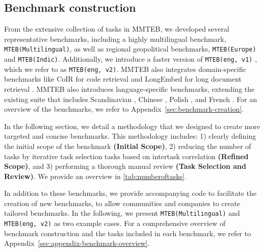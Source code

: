 \subsection{Benchmark construction}
\label{sec:benchmarkconstruction}
From the extensive collection of tasks in MMTEB, we developed several representative benchmarks, including a highly multilingual benchmark, \texttt{MTEB(Multilingual)}, as well as regional geopolitical benchmarks, \texttt{MTEB(Europe)} and \texttt{MTEB(Indic)}. Additionally, we introduce a faster version of \texttt{MTEB(eng, v1)} \citep{muennighoff2023mteb}, which we refer to as \texttt{MTEB(eng, v2)}. MMTEB also integrates domain-specific benchmarks like CoIR for code retrieval \citep{li2024coircomprehensivebenchmarkcode} and LongEmbed for long document retrieval  \citep{zhu2024longembed}. MMTEB also introduces language-specific benchmarks, extending the existing suite that includes Scandinavian \citep{enevoldsen2024scandinavian}, Chinese \citep{xiao2024cpack}, Polish \citep{poswiata2024plmteb}, and French \citep{ciancone2024extending}. For an overview of the benchmarks, we refer to Appendix~\ref{sec:benchmark-creation}.

In the following section, we detail a methodology that we designed to create more targeted and concise benchmarks. This methodology includes: 1) clearly defining the initial scope of the benchmark \textbf{(Initial Scope)}, 2) reducing the number of tasks by iterative task selection tasks based on intertask correlation \textbf{(Refined Scope)}, and 3) performing a thorough manual review \textbf{(Task Selection and Review)}. We provide an overview in \autoref{tab:numberoftasks}.

In addition to these benchmarks, we provide accompanying code to facilitate the creation of new benchmarks, to allow communities and companies to create tailored benchmarks. In the following, we present \texttt{MTEB(Multilingual)} and \texttt{MTEB(eng, v2)} as two example cases. For a comprehensive overview of benchmark construction and the tasks included in each benchmark, we refer to Appendix~\ref{sec:appendix-benchmark-overview}.
\newline





